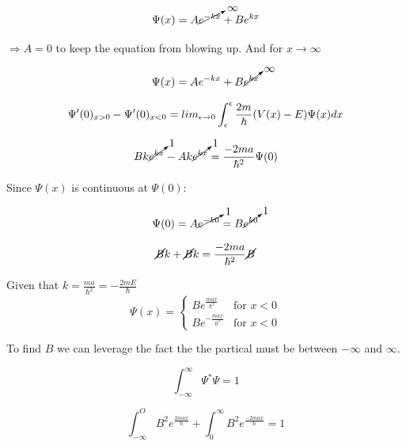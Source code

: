 \documentclass[12pt]{article}
\begin{document}
\begin{equation}
  \Psi(x)=A\cancelto{\infty}{e^{-kx}}+Be^{kx}
\end{equation}

$\Rightarrow A=0$ to keep the equation from blowing up.
And for $x\to\infty$

\begin{equation}
  \Psi(x)=A{e^{-kx}}+B\cancelto{\infty}{e^{kx}}
\end{equation}

\begin{equation}\label{eq:discont}
    \Psi'(0)_{x>0} - \Psi'(0)_{x<0} = lim_{\epsilon\to{}0} \int_\epsilon^\epsilon{}\frac{2m}{\hbar}(V(x)-E)\Psi(x)dx\\
\end{equation}

\begin{equation}
  Bk\cancelto{1}{e^{kx}}-Ak\cancelto{1}{e^{kx}}=\frac{-2ma}{\hbar^2}\Psi(0)
\end{equation}

Since $\Psi(x)$ is continuous at $\Psi(0)$:

\begin{equation}
  \Psi(0)=A\cancelto{1}{e^{-k0}}=B\cancelto{1}{e^{k0}}
\end{equation}


\begin{equation}
  \cancel{B}k+\cancel{B}k=\frac{-2ma}{\hbar^2}\cancel{B}
\end{equation}

Given that $k=\frac{ma}{\hbar^2}=-\frac{2mE}{\hbar}$
\begin{equation}
  \Psi(x)=
    \begin{cases}
      Be^{\frac{max}{\hbar^2}} &\mbox{for } x<0 \\
      Be^{-\frac{max}{\hbar^2}} &\mbox{for } x<0
    \end{cases}
\end{equation}

To find $B$ we can leverage the fact the the partical must be between $-\infty$ and $\infty$.

\begin{equation}
  \int_{-\infty}^{\infty}\Psi^*\Psi=1
\end{equation}

\begin{equation}
  \int_{-\infty}^{O} B^2e^{\frac{2max}{\hbar}} + \int_{0}^{\infty} B^2e^{\frac{-2max}{\hbar}}  = 1
\end{equation}
\end{document}
